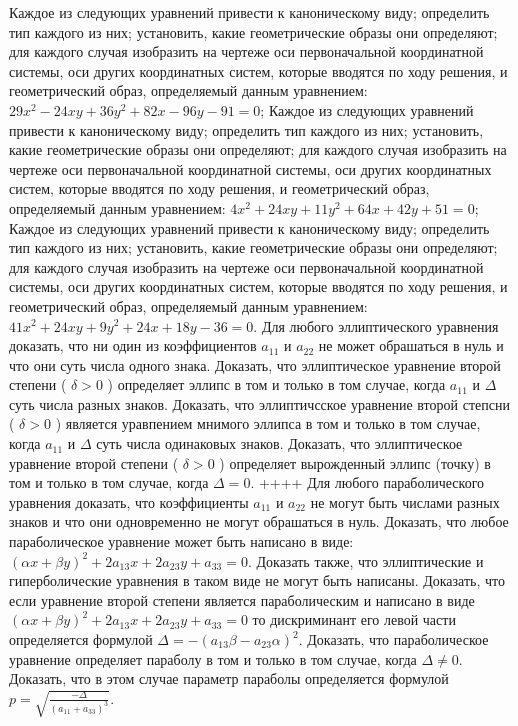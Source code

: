 Каждое из следующих уравнений привести к каноническому виду; определить тип каждого из них; установить, какие геометрические образы они определяют; для каждого случая изобразить на чертеже оси первоначальной координатной системы, оси других координатных систем, которые вводятся по ходу решения, и геометрический образ, определяемый данным уравнением: $29 x^2-24 x y+36 y^2+82 x-96 y-91=0$;
Каждое из следующих уравнений привести к каноническому виду; определить тип каждого из них; установить, какие геометрические образы они определяют; для каждого случая изобразить на чертеже оси первоначальной координатной системы, оси других координатных систем, которые вводятся по ходу решения, и геометрический образ, определяемый данным уравнением: $4 x^2+24 x y+11 y^2+64 x+42 y+51=0$;
Каждое из следующих уравнений привести к каноническому виду; определить тип каждого из них; установить, какие геометрические образы они определяют; для каждого случая изобразить на чертеже оси первоначальной координатной системы, оси других координатных систем, которые вводятся по ходу решения, и геометрический образ, определяемый данным уравнением: $41 x^2+24 x y+9 y^2+24 x+18 y-36=0$.
Для любого эллиптического уравнения доказать, что ни один из коэффициентов $a_{11}$ и $a_{22}$ не может обрашаться в нуль и что они суть числа одного знака.
Доказать, что эллиптическое уравнение второй степени ( $\delta>0$ ) определяет эллипс в том и только в том случае, когда $a_{11}$ и $\Delta$ суть числа разных знаков.
Доказать, что эллиптичсское уравнение второй степсни ( $\delta>0$ ) является уравпением мнимого эллипса в том и только в том случае, когда $a_{11}$ и $\Delta$ суть числа одинаковых знаков.
Доказать, что эллиптическое уравнение второй степени ( $\delta>0$ ) определяет вырожденный эллипс (точку) в том и только в том случае, когда $\Delta=0$.
++++
Для любого параболического уравнения доказать, что коэффициенты $a_{11}$ и $a_{22}$ не могут быть числами разных знаков и что они одновременно не могут обрашаться в нуль.
Доказать, что любое параболическое уравнение может быть написано в виде: $ (\alpha x+\beta y) ^2+2a_{13}x+2a_{23}y+a_{33}=0$. Доказать также, что эллиптические и гиперболические уравнения в таком виде не могут быть написаны.
Доказать, что если уравнение второй степени является параболическим и написано в виде $ (\alpha x+\beta y) ^2+2a_{13}x+2a_{23}y+a_{33}=0$ то дискриминант его левой части определяется формулой $\Delta=- (a_{13} \beta-a_{23} \alpha) ^2$.
Доказать, что параболическое уравнение определяет параболу в том и только в том случае, когда $\Delta \neq 0$. Доказать, что в этом случае параметр параболы определяется формулой $p=\sqrt{\frac{-\Delta}{ (a_{11}+a_{33}) ^3}}$.
